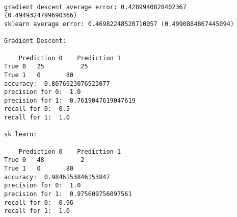 \documentclass[11pt]{article}
\begin{document}
    \begin{center}
    \end{center}
    { \hspace*{\fill} \\}
    
    \begin{Verbatim}[commandchars=\\\{\}]
gradient descent average error: 0.4289940828402367 (0.4949324799690366)
sklearn average error: 0.46982248520710057 (0.4990884867445094)

Gradient Descent: 

	Prediction 0	Prediction 1
True 0	 25 		 25
True 1	 0 		 80
accuracy:  0.8076923076923077
precision for 0:  1.0
precision for 1:  0.7619047619047619
recall for 0:  0.5
recall for 1:  1.0

sk learn: 

	Prediction 0	Prediction 1
True 0	 48 		 2
True 1	 0 		 80
accuracy:  0.9846153846153847
precision for 0:  1.0
precision for 1:  0.975609756097561
recall for 0:  0.96
recall for 1:  1.0

    \end{Verbatim}


    
    
    
    
\end{document}
